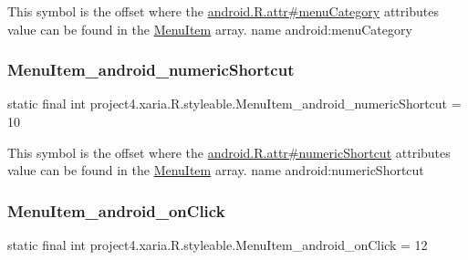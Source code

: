 This symbol is the offset where the \hyperlink{}{android.\+R.\+attr\#menu\+Category} attribute\textquotesingle{}s value can be found in the \hyperlink{classproject4_1_1xaria_1_1R_1_1styleable_a8a573827fcaba6497e560662224b5530}{Menu\+Item} array.  name android\+:menu\+Category \mbox{\label{classproject4_1_1xaria_1_1R_1_1styleable_ae2e9861ee0e27e73ac735e1186c10eba}} 
\subsubsection{\texorpdfstring{Menu\+Item\+\_\+android\+\_\+numeric\+Shortcut}{MenuItem\_android\_numericShortcut}}
{\footnotesize\ttfamily static final int project4.\+xaria.\+R.\+styleable.\+Menu\+Item\+\_\+android\+\_\+numeric\+Shortcut = 10\hspace{0.3cm}{\ttfamily [static]}}

This symbol is the offset where the \hyperlink{}{android.\+R.\+attr\#numeric\+Shortcut} attribute\textquotesingle{}s value can be found in the \hyperlink{classproject4_1_1xaria_1_1R_1_1styleable_a8a573827fcaba6497e560662224b5530}{Menu\+Item} array.  name android\+:numeric\+Shortcut \mbox{\label{classproject4_1_1xaria_1_1R_1_1styleable_ae290bec2869c281c693e4b84883cb6b9}} 
\subsubsection{\texorpdfstring{Menu\+Item\+\_\+android\+\_\+on\+Click}{MenuItem\_android\_onClick}}
{\footnotesize\ttfamily static final int project4.\+xaria.\+R.\+styleable.\+Menu\+Item\+\_\+android\+\_\+on\+Click = 12\hspace{0.3cm}{\ttfamily [static]}}


